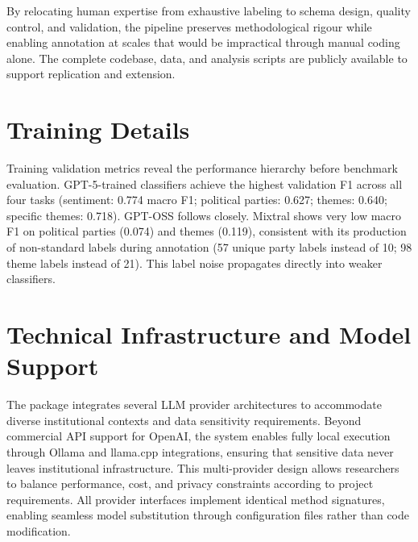 \documentclass[12pt]{article}
\begin{document}
By relocating human expertise from exhaustive labeling to schema design, quality control, and validation, the pipeline preserves methodological rigour while enabling annotation at scales that would be impractical through manual coding alone. The complete codebase, data, and analysis scripts are publicly available to support replication and extension.



\newpage

\appendix

\section{Training Details}
\label{sec:training-details}





Training validation metrics reveal the performance hierarchy before benchmark evaluation. GPT-5-trained classifiers achieve the highest validation F1 across all four tasks (sentiment: 0.774 macro F1; political parties: 0.627; themes: 0.640; specific themes: 0.718). GPT-OSS follows closely. Mixtral shows very low macro F1 on political parties (0.074) and themes (0.119), consistent with its production of non-standard labels during annotation (57 unique party labels instead of 10; 98 theme labels instead of 21). This label noise propagates directly into weaker classifiers.











\newpage
\section{Technical Infrastructure and Model Support}
\label{sec:technical-infrastructure}

The package integrates several LLM provider architectures to accommodate diverse institutional contexts and data sensitivity requirements. Beyond commercial API support for OpenAI, the system enables fully local execution through Ollama and llama.cpp integrations, ensuring that sensitive data never leaves institutional infrastructure. This multi-provider design allows researchers to balance performance, cost, and privacy constraints according to project requirements. All provider interfaces implement identical method signatures, enabling seamless model substitution through configuration files rather than code modification.
\end{document}
